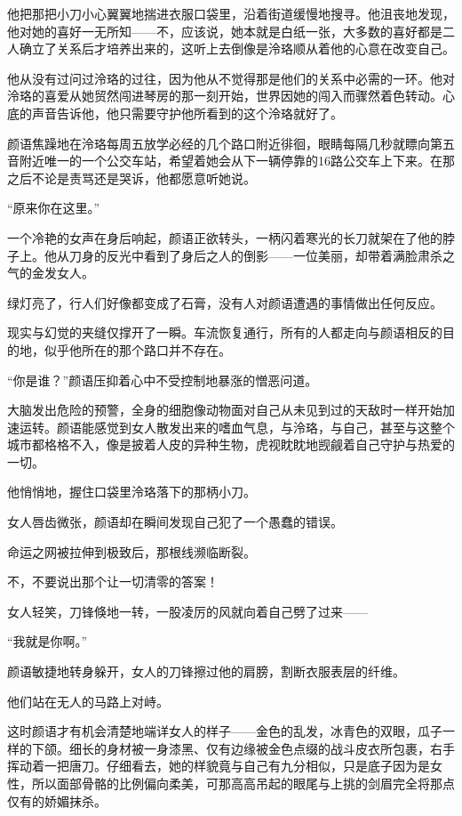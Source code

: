 \documentclass[UTF8, scheme = chinese, openany]{ctexbook}
\begin{document}
他把那把小刀小心翼翼地揣进衣服口袋里，沿着街道缓慢地搜寻。他沮丧地发现，他对她的喜好一无所知——不，应该说，她本就是白纸一张，大多数的喜好都是二人确立了关系后才培养出来的，这听上去倒像是泠珞顺从着他的心意在改变自己。

他从没有过问过泠珞的过往，因为他从不觉得那是他们的关系中必需的一环。他对泠珞的喜爱从她贸然闯进琴房的那一刻开始，世界因她的闯入而骤然着色转动。心底的声音告诉他，他只需要守护他所看到的这个泠珞就好了。

颜语焦躁地在泠珞每周五放学必经的几个路口附近徘徊，眼睛每隔几秒就瞟向第五音附近唯一的一个公交车站，希望着她会从下一辆停靠的16路公交车上下来。在那之后不论是责骂还是哭诉，他都愿意听她说。

“原来你在这里。”

一个冷艳的女声在身后响起，颜语正欲转头，一柄闪着寒光的长刀就架在了他的脖子上。他从刀身的反光中看到了身后之人的倒影——一位美丽，却带着满脸肃杀之气的金发女人。

绿灯亮了，行人们好像都变成了石膏，没有人对颜语遭遇的事情做出任何反应。

现实与幻觉的夹缝仅撑开了一瞬。车流恢复通行，所有的人都走向与颜语相反的目的地，似乎他所在的那个路口并不存在。

“你是谁？”颜语压抑着心中不受控制地暴涨的憎恶问道。

大脑发出危险的预警，全身的细胞像动物面对自己从未见到过的天敌时一样开始加速运转。颜语能感觉到女人散发出来的嗜血气息，与泠珞，与自己，甚至与这整个城市都格格不入，像是披着人皮的异种生物，虎视眈眈地觊觎着自己守护与热爱的一切。

他悄悄地，握住口袋里泠珞落下的那柄小刀。

女人唇齿微张，颜语却在瞬间发现自己犯了一个愚蠢的错误。

命运之网被拉伸到极致后，那根线濒临断裂。

不，不要说出那个让一切清零的答案！

女人轻笑，刀锋倏地一转，一股凌厉的风就向着自己劈了过来——

“我就是你啊。”

\vspace{1.5em}

颜语敏捷地转身躲开，女人的刀锋擦过他的肩膀，割断衣服表层的纤维。

他们站在无人的马路上对峙。

这时颜语才有机会清楚地端详女人的样子——金色的乱发，冰青色的双眼，瓜子一样的下颌。细长的身材被一身漆黑、仅有边缘被金色点缀的战斗皮衣所包裹，右手挥动着一把唐刀。仔细看去，她的样貌竟与自己有九分相似，只是底子因为是女性，所以面部骨骼的比例偏向柔美，可那高高吊起的眼尾与上挑的剑眉完全将那点仅有的娇媚抹杀。
\end{document}
